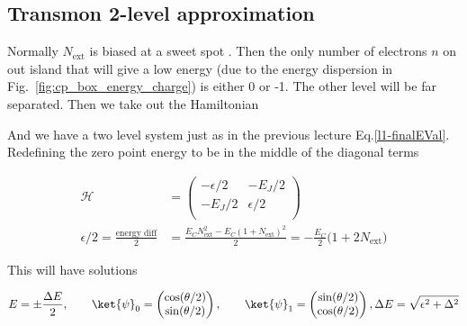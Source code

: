  \newpage
 \subsection{Transmon 2-level approximation}
 \label{sec:transmon-2-level}


 \noindent Normally  $ N_\text{ext} $  is biased at  a sweet spot  .   Then the only  number of
 electrons   $n$   on   out   island   that   will   give   a  low   energy   (due   to   the   energy   dispersion   in
 Fig.~\ref{fig:cp_box_energy_charge}) is either  0 or -1.  The other level  will be far separated. Then we  take out the
 Hamiltonian


 \noindent And we have a two level system just  as in the previous lecture Eq.\eqref{l1-finalEVal}.  Redefining the zero
 point energy to be in the middle of the diagonal terms

 \begin{equation}
   \begin{aligned}
     \mathcal{H} & = \begin{pmatrix}
       -\epsilon/2 & -E_J/2\\
       -E_J/2 & \epsilon/2\\
     \end{pmatrix}\\
     \epsilon/2    =   \frac{\text{energy    diff}}{2}   &    =   \frac{E_CN_\text{ext}^2-E_C(1+N_\text{ext})^2}{2}    =
     -\frac{E_C}{2}\big(1+2N_\text{ext}\big)
   \end{aligned}
 \end{equation}

\begin{framed}\noindent
  This will have solutions

   \begin{equation}
     E = \pm \frac{\Delta E}{2}, \qquad \ket{\psi}_0 = \begin{pmatrix}
       \cos(\theta/2) \\ \sin(\theta/2)
     \end{pmatrix},  \qquad  \ket{\psi}_1  = \begin{pmatrix}  \sin(\theta/2)  \\
       \cos(\theta/2)
     \end{pmatrix}, \Delta E = \sqrt{\epsilon^2+\Delta^2}
   \end{equation}
 \end{framed}


